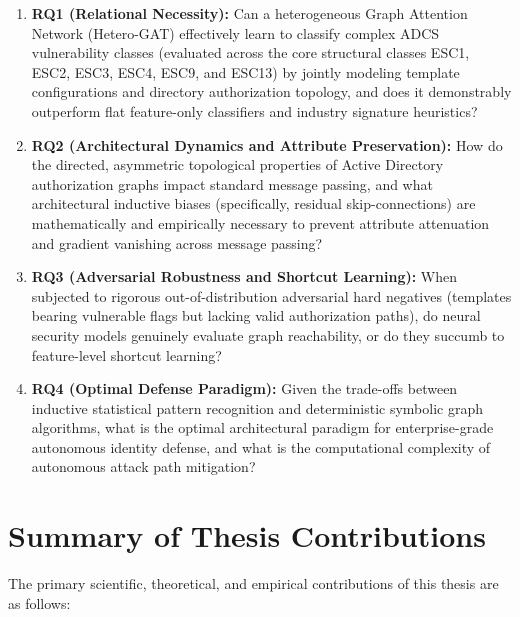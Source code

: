 \begin{enumerate}
    \item \textbf{RQ1 (Relational Necessity):} Can a heterogeneous Graph Attention Network (Hetero-GAT) effectively learn to classify complex ADCS vulnerability classes (evaluated across the core structural classes ESC1, ESC2, ESC3, ESC4, ESC9, and ESC13) by jointly modeling template configurations and directory authorization topology, and does it demonstrably outperform flat feature-only classifiers and industry signature heuristics?
    \item \textbf{RQ2 (Architectural Dynamics and Attribute Preservation):} How do the directed, asymmetric topological properties of Active Directory authorization graphs impact standard message passing, and what architectural inductive biases (specifically, residual skip-connections) are mathematically and empirically necessary to prevent attribute attenuation and gradient vanishing across message passing?
    \item \textbf{RQ3 (Adversarial Robustness and Shortcut Learning):} When subjected to rigorous out-of-distribution adversarial hard negatives (templates bearing vulnerable flags but lacking valid authorization paths), do neural security models genuinely evaluate graph reachability, or do they succumb to feature-level shortcut learning?
    \item \textbf{RQ4 (Optimal Defense Paradigm):} Given the trade-offs between inductive statistical pattern recognition and deterministic symbolic graph algorithms, what is the optimal architectural paradigm for enterprise-grade autonomous identity defense, and what is the computational complexity of autonomous attack path mitigation?
\end{enumerate}

\section{Summary of Thesis Contributions}
The primary scientific, theoretical, and empirical contributions of this thesis are as follows:

